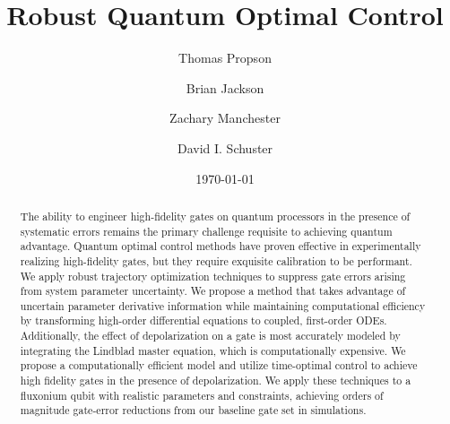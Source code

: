 \title{Robust Quantum Optimal Control}

\author{Thomas Propson}
\author{Brian Jackson}
\author{Zachary Manchester}
\author{David I. Schuster}

\date{\today}

\begin{abstract}
  The ability to engineer high-fidelity gates on quantum processors in the presence of
  systematic errors remains the primary challenge requisite to achieving quantum advantage.
  Quantum optimal control methods have proven effective in experimentally
  realizing high-fidelity gates, but they require exquisite calibration to be performant.
  We apply robust trajectory optimization techniques to suppress gate errors arising from system
  parameter uncertainty.
  We propose a method that takes advantage of uncertain parameter
  derivative information while maintaining
  computational efficiency by transforming high-order differential equations to coupled,
  first-order ODEs.
  Additionally, the effect of depolarization on a gate is most accurately modeled by
  integrating the Lindblad master equation,
  which is computationally expensive.
  We propose a computationally efficient model
  and utilize time-optimal control to achieve high fidelity gates in the presence of depolarization.
  We apply these techniques to a fluxonium qubit with realistic
  parameters and constraints,
  achieving orders of magnitude gate-error reductions from our baseline gate set in simulations.
\end{abstract}

\maketitle
